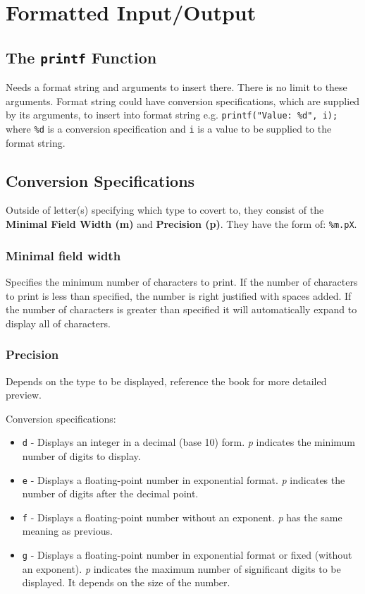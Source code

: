 \documentclass[openany]{book}
\begin{document}
    \chapter{Formatted Input/Output}

    \section{The \texttt{printf} Function}
    Needs a format string and arguments to insert there. There is no limit to these
    arguments. Format string could have conversion specifications, which are supplied by
    its arguments, to insert into format string e.g. \texttt{printf("Value: \%d", i);}
    where \texttt{\%d} is a conversion specification and \texttt{i} is a value to be
    supplied to the format string.

    \section{Conversion Specifications}
    Outside of letter(s) specifying which type to covert to, they consist of the \textbf{Minimal
    Field Width (m)} and \textbf{Precision (p)}. They have the form of: \texttt{\%m.pX}.

    \subsection*{Minimal field width}
    Specifies the minimum number of characters to print. If the number of characters
    to print is less than specified, the number is right justified with spaces added. If the number of
    characters is greater than specified it will automatically expand to display all of characters.

    \subsection*{Precision}
    Depends on the type to be displayed, reference the book for more detailed preview. 
    \newpage

    Conversion specifications:
    \begin{itemize}
        \item \texttt{d} - Displays an integer in a decimal (base 10) form. \textit{p} indicates
        the minimum number of digits to display.
        \item \texttt{e} - Displays a floating-point number in exponential format. \textit{p}
        indicates the number of digits after the decimal point.
        \item \texttt{f} - Displays a floating-point number without an exponent. \textit{p} has
        the same meaning as previous.
        \item \texttt{g} - Displays a floating-point number in exponential format or
        fixed (without an exponent). \textit{p} indicates the maximum number of
        significant digits to be displayed. It depends on the size of the number.
    \end{itemize}
\end{document}
